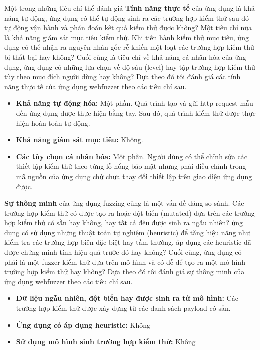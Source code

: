 Một trong những tiêu chí thể đánh giá \textbf{Tính năng thực tế} của ứng dụng là khả năng tự động, ứng dụng có thể tự động sinh ra các trường hợp kiểm thử sau đó tự động vận hành và phán đoán kêt quả kiểm thử được không? Một tiêu chí nữa là khả năng giám sát mục tiêu kiểm thử. Khi tiến hành kiểm thử mục tiêu, ứng dụng có thể nhận ra nguyên nhân gốc rễ khiến một loạt các trường hợp kiểm thử bị thất bại hay không? Cuối cùng là tiêu chí về khả năng cá nhân hóa của ứng dụng, ứng dụng có những lựa chọn về độ sâu (level) hay tập trường hợp kiểm thử tùy theo mục đích người dùng hay không? Dựa theo đó tôi đánh giá các tính năng thực tế của ứng dụng webfuzzer theo các tiêu chí sau.
\begin{itemize}
    \item \textbf{Khả năng tự động hóa:} Một phần. Quá trình tạo và gửi \acrshort{http} request mẫu đến ứng dụng được thực hiện bằng tay. Sau đó, quá trình kiểm thử được thực hiện hoàn toàn tự động.
    \item \textbf{Khả năng giám sát mục tiêu:} Không.
    \item \textbf{Các tùy chọn cá nhân hóa:} Một phần. Người dùng có thể chỉnh sửa các thiết lập kiểm thử theo từng lỗ hổng bảo mật nhưng phải điều chỉnh trong mã nguồn của ứng dụng chứ chưa thay đổi thiết lập trên giao diện ứng dụng được.
\end{itemize}
\textbf{Sự thông minh} của ứng dụng fuzzing cũng là một vấn đề đáng so sánh. Các trường hợp kiểm thử có được tạo ra hoặc đột biến (mutated) dựa trên các trường hợp kiểm thử có sẵn hay không, hay tất cả đêu được sinh ra ngẫu nhiên? ứng dụng có sử dụng những thuật toán tự nghiệm (heuristic) để tăng hiệu năng như kiểm tra các trường hợp biên đặc biệt hay tầm thường, áp dụng các heuristic đã được chứng minh tính hiệu quả trước đó hay không? Cuối cùng, ứng dụng có phải là một fuzzer kiểm thử dựa trên mô hình và có dễ để tạo ra một mô hình trường hợp kiểm thử hay không? Dựa theo đó tôi đánh giá sự thông minh của ứng dụng webfuzzer theo các tiêu chí sau.
\begin{itemize}
    \item \textbf{Dữ liệu ngẫu nhiên, đột biến hay được sinh ra từ mô hình:} Các trường hợp kiểm thử được xây dựng từ các danh sách payload có sẵn.
    \item \textbf{Ứng dụng có áp dụng heuristic:} Không
    \item \textbf{Sử dụng mô hình sinh trường hợp kiểm thử:} Không
\end{itemize}
